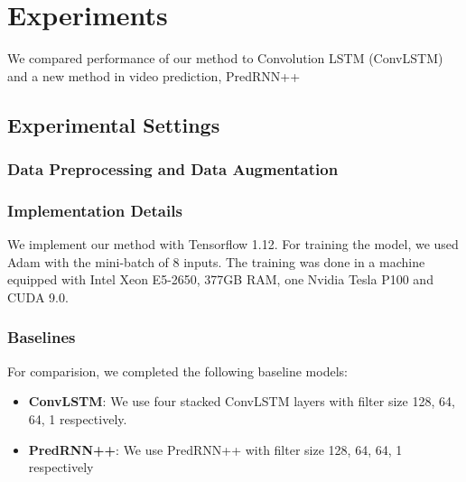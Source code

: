 \section{Experiments}
We compared performance of our method to Convolution LSTM (ConvLSTM) and a new method in video prediction, PredRNN++ %

\subsection{Experimental Settings}
\subsubsection{Data Preprocessing and Data Augmentation}

\subsubsection{Implementation Details}
We implement our method with Tensorflow 1.12. %
For training the model, we used Adam %
with the mini-batch of 8 inputs. The training was done in a machine equipped with Intel Xeon E5-2650, 377GB RAM, one Nvidia Tesla P100 and CUDA 9.0.

\subsubsection{Baselines}
For comparision, we completed the following baseline models:
\begin{itemize}
    \item \textbf{ConvLSTM}: We use four stacked ConvLSTM layers with filter size 128, 64, 64, 1 respectively. 
    \item \textbf{PredRNN++}: We use PredRNN++ with filter size 128, 64, 64, 1 respectively
\end{itemize}


